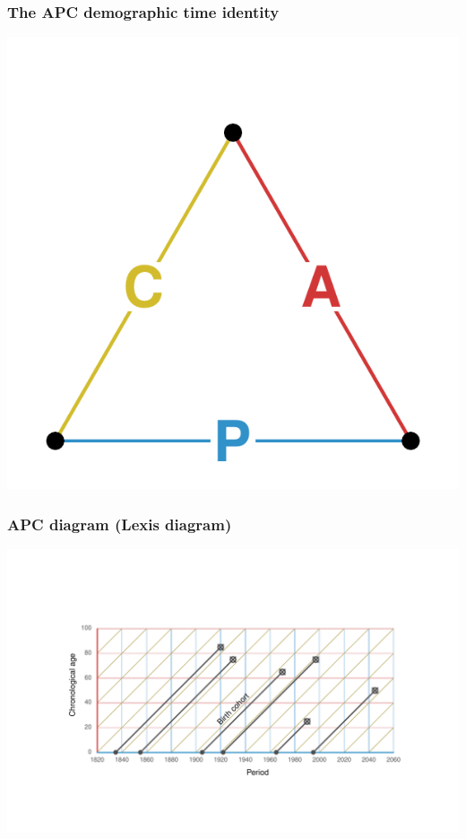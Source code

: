 \documentclass[20pt]{beamer}
\begin{document}
\begin{frame}
\frametitle{The APC demographic time identity}
\vspace{-4em}
\begin{center}
\includegraphics[scale=1.7]{Figures/APCid.pdf}
\end{center}
\end{frame}


\begin{frame}
\frametitle{APC diagram (Lexis diagram)}
\begin{center}
\includegraphics[trim= 200 200 200 200, scale=1.5]{Figures/APCrt.pdf}
\end{center}
\end{frame}
\end{document}
